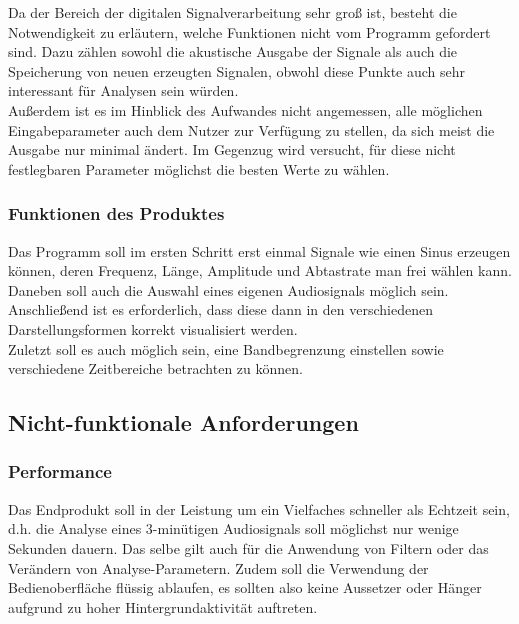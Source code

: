 \documentclass[a4paper]{article}
\begin{document}
Da der Bereich der digitalen Signalverarbeitung sehr groß ist, besteht die Notwendigkeit zu erläutern, welche Funktionen nicht vom Programm gefordert sind. Dazu zählen sowohl die akustische Ausgabe der Signale als auch die Speicherung von neuen erzeugten Signalen, obwohl diese Punkte auch sehr interessant für Analysen sein würden.\\
Außerdem ist es im Hinblick des Aufwandes nicht angemessen, alle möglichen Eingabeparameter auch dem Nutzer zur Verfügung zu stellen, da sich meist die Ausgabe nur minimal ändert. Im Gegenzug wird versucht, für diese nicht festlegbaren Parameter möglichst die besten Werte zu wählen.

\subsubsection{Funktionen des Produktes}

Das Programm soll im ersten Schritt erst einmal Signale wie einen Sinus erzeugen können, deren Frequenz, Länge, Amplitude und Abtastrate man frei wählen kann. Daneben soll auch die Auswahl eines eigenen Audiosignals möglich sein.\\
Anschließend ist es erforderlich, dass diese dann in den verschiedenen Darstellungsformen korrekt visualisiert werden.\\
Zuletzt soll es auch möglich sein, eine Bandbegrenzung einstellen sowie verschiedene Zeitbereiche betrachten zu können.

\subsection{Nicht-funktionale Anforderungen}\label{subsec:nicht-funktionaleAnforderungen}
\subsubsection{Performance}

Das Endprodukt soll in der Leistung um ein Vielfaches schneller als Echtzeit sein, d.h. die Analyse eines 3-minütigen Audiosignals soll möglichst nur wenige Sekunden dauern. Das selbe gilt auch für die Anwendung von Filtern oder das Verändern von Analyse-Parametern. Zudem soll die Verwendung der Bedienoberfläche flüssig ablaufen, es sollten also keine Aussetzer oder Hänger aufgrund zu hoher Hintergrundaktivität auftreten.
\end{document}
